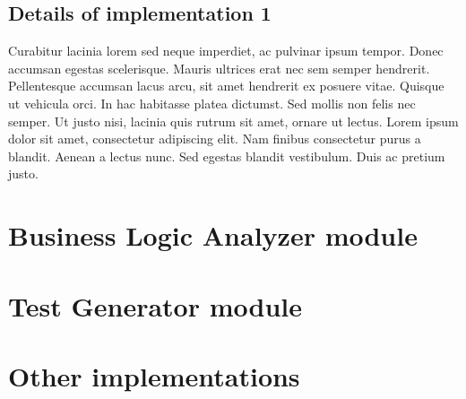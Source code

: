 \subsection{Details of implementation 1}
Curabitur lacinia lorem sed neque imperdiet, ac pulvinar ipsum tempor. Donec accumsan egestas scelerisque. Mauris ultrices erat nec sem semper hendrerit. Pellentesque accumsan lacus arcu, sit amet hendrerit ex posuere vitae. Quisque ut vehicula orci. In hac habitasse platea dictumst. Sed mollis non felis nec semper. Ut justo nisi, lacinia quis rutrum sit amet, ornare ut lectus. Lorem ipsum dolor sit amet, consectetur adipiscing elit. Nam finibus consectetur purus a blandit. Aenean a lectus nunc. Sed egestas blandit vestibulum. Duis ac pretium justo.

\section{Business Logic Analyzer module}

\section{Test Generator module}

\section{Other implementations}